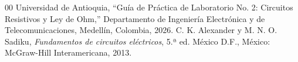 \documentclass[conference,10pt]{IEEEtran}
\begin{document}
\begin{thebibliography}{00}
  Universidad de Antioquia, ``Guía de Práctica de Laboratorio No. 2: Circuitos Resistivos y Ley de Ohm,'' Departamento de Ingeniería Electrónica y de Telecomunicaciones, Medellín, Colombia, 2026.
  C. K. Alexander y M. N. O. Sadiku, \emph{Fundamentos de circuitos eléctricos}, 5.ª ed. México D.F., México: McGraw-Hill Interamericana, 2013.
\end{thebibliography}
\end{document}
